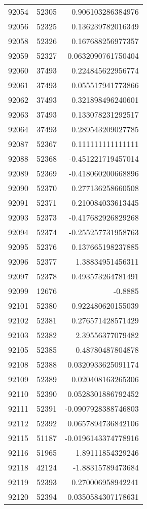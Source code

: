 \begin{tabular}{r | r | r}
92054 & 52305 & 0.906103286384976 \\
92056 & 52325 & 0.136239782016349 \\
92058 & 52326 & 0.167688256977357 \\
92059 & 52327 & 0.0632090761750404 \\
92060 & 37493 & 0.224845622956774 \\
92061 & 37493 & 0.055517941773866 \\
92062 & 37493 & 0.321898496240601 \\
92063 & 37493 & 0.133078231292517 \\
92064 & 37493 & 0.289543209027785 \\
92087 & 52367 & 0.111111111111111 \\
92088 & 52368 & -0.451221719457014 \\
92089 & 52369 & -0.418060200668896 \\
92090 & 52370 & 0.277136258660508 \\
92091 & 52371 & 0.210084033613445 \\
92093 & 52373 & -0.417682926829268 \\
92094 & 52374 & -0.255257731958763 \\
92095 & 52376 & 0.137665198237885 \\
92096 & 52377 & 1.38834951456311 \\
92097 & 52378 & 0.493573264781491 \\
92099 & 12676 & -0.8885 \\
92101 & 52380 & 0.922480620155039 \\
92102 & 52381 & 0.276571428571429 \\
92103 & 52382 & 2.39556377079482 \\
92105 & 52385 & 0.48780487804878 \\
92108 & 52388 & 0.0320933625091174 \\
92109 & 52389 & 0.020408163265306 \\
92110 & 52390 & 0.0528301886792452 \\
92111 & 52391 & -0.0907928388746803 \\
92112 & 52392 & 0.0657894736842106 \\
92115 & 51187 & -0.0196143374778916 \\
92116 & 51965 & -1.89111854329246 \\
92118 & 42124 & -1.88315789473684 \\
92119 & 52393 & 0.270006958942241 \\
92120 & 52394 & 0.0350584307178631 \\

\end{tabular}
